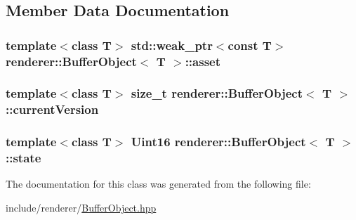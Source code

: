 \subsection{Member Data Documentation}
\hypertarget{classrenderer_1_1BufferObject_ad747c7e09a4acda6847b6fca9977eed6}{
\subsubsection[{asset}]{\setlength{\rightskip}{0pt plus 5cm}template$<$class T$>$ std\-::weak\-\_\-ptr$<$const T$>$ {\bf renderer\-::\-Buffer\-Object}$<$ T $>$\-::asset\hspace{0.3cm}{\ttfamily [protected]}}}\label{classrenderer_1_1BufferObject_ad747c7e09a4acda6847b6fca9977eed6}
\hypertarget{classrenderer_1_1BufferObject_a8e0f07fa5f1cbf15e3235c478a9f3d42}{
\subsubsection[{current\-Version}]{\setlength{\rightskip}{0pt plus 5cm}template$<$class T$>$ size\-\_\-t {\bf renderer\-::\-Buffer\-Object}$<$ T $>$\-::current\-Version\hspace{0.3cm}{\ttfamily [protected]}}}\label{classrenderer_1_1BufferObject_a8e0f07fa5f1cbf15e3235c478a9f3d42}
\hypertarget{classrenderer_1_1BufferObject_a2eb925a833a8b046911f48607cb255e7}{
\subsubsection[{state}]{\setlength{\rightskip}{0pt plus 5cm}template$<$class T$>$ Uint16 {\bf renderer\-::\-Buffer\-Object}$<$ T $>$\-::state}}\label{classrenderer_1_1BufferObject_a2eb925a833a8b046911f48607cb255e7}


The documentation for this class was generated from the following file\-:\begin{DoxyCompactItemize}
\item 
include/renderer/\hyperlink{BufferObject_8hpp}{Buffer\-Object.\-hpp}\end{DoxyCompactItemize}
